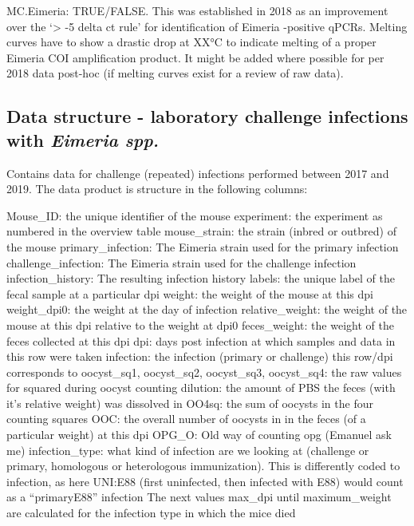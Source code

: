 \documentclass[
]{article}
\begin{document}
MC.Eimeria: TRUE/FALSE. This was established in 2018 as an improvement
over the `\textgreater{} -5 delta ct rule' for identification of Eimeria
-positive qPCRs. Melting curves have to show a drastic drop at XX°C to
indicate melting of a proper Eimeria COI amplification product. It might
be added where possible for per 2018 data post-hoc (if melting curves
exist for a review of raw data).

\subsection{\texorpdfstring{Data structure - laboratory challenge
infections with \emph{Eimeria
spp.}}{Data structure - laboratory challenge infections with Eimeria spp.}}\label{data-structure---laboratory-challenge-infections-with-eimeria-spp.}

Contains data for challenge (repeated) infections performed between 2017
and 2019. The data product is structure in the following columns:

Mouse\_ID: the unique identifier of the mouse experiment: the experiment
as numbered in the overview table mouse\_strain: the strain (inbred or
outbred) of the mouse primary\_infection: The Eimeria strain used for
the primary infection challenge\_infection: The Eimeria strain used for
the challenge infection infection\_history: The resulting infection
history labels: the unique label of the fecal sample at a particular dpi
weight: the weight of the mouse at this dpi weight\_dpi0: the weight at
the day of infection relative\_weight: the weight of the mouse at this
dpi relative to the weight at dpi0 feces\_weight: the weight of the
feces collected at this dpi dpi: days post infection at which samples
and data in this row were taken infection: the infection (primary or
challenge) this row/dpi corresponds to oocyst\_sq1, oocyst\_sq2,
oocyst\_sq3, oocyst\_sq4: the raw values for squared during oocyst
counting dilution: the amount of PBS the feces (with it's relative
weight) was dissolved in OO4sq: the sum of oocysts in the four counting
squares OOC: the overall number of oocysts in in the feces (of a
particular weight) at this dpi OPG\_O: Old way of counting opg (Emanuel
ask me) infection\_type: what kind of infection are we looking at
(challenge or primary, homologous or heterologous immunization). This is
differently coded to infection, as here UNI:E88 (first uninfected, then
infected with E88) would count as a ``primaryE88'' infection The next
values max\_dpi until maximum\_weight are calculated for the infection
type in which the mice died
\end{document}
